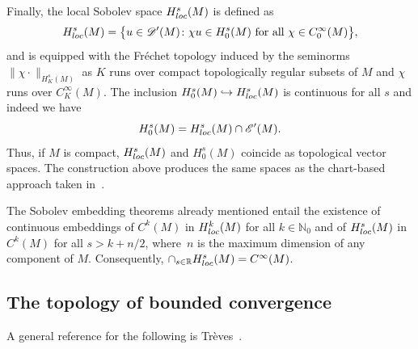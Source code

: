 \documentclass[11pt]{article}
\numberwithin{equation}{section}
\numberwithin{equation}{section}
\newcommand{\RR}{{\mathbb R}}
\newcommand{\NN}{{\mathbb N}}
\newcommand{\DD}{{\mathscr D}}
\newcommand{\EE}{{\mathscr E}}
\newcommand{\loc}{{\rm loc}}
\begin{document}
 Finally, the local Sobolev space $H^s_\loc(M)$ is defined as
 \begin{equation*}
 	H^s_\loc(M) = \big\{u\in\DD'(M)\colon \text{$\chi u\in H^s_0(M)$ for all $\chi\in C_0^\infty({M})$}\big\},
 \end{equation*}
 and is equipped with the Fr\'echet topology induced by the seminorms $\|\chi \cdot\|_{H^s_{K}(M)}$ as $K$ runs over compact topologically regular subsets of $M$ and $\chi$ runs over $C^\infty_K(M)$. The inclusion
 $H^s_0(M)\hookrightarrow H^s_\loc(M)$ is continuous for all $s$ and indeed we have
 \begin{equation*}
 	H^s_0(M) = H^s_\loc(M) \cap \EE'(M).
 \end{equation*}
 Thus, if $M$ is compact, $H^s_\loc(M)$ and $H^s_0(M)$ coincide as topological vector spaces. The construction above produces the same spaces as the chart-based approach taken in~\cite{Hormander3}.

 The Sobolev embedding theorems already mentioned entail the existence of continuous embeddings of $C^k(M)$ in $H^k_\loc(M)$ for all $k\in\NN_0$ and of $H^s_\loc(M)$ in $C^k(M)$ for all $s>k+n/2$, where~$n$ is the maximum dimension of any component of $M$. Consequently, $\cap_{s\in\RR} H^s_\loc(M)=C^\infty(M)$.

 \subsection{The topology of bounded convergence}\label{appx:top_bded_cvgnce}

 A general reference for the following is Tr\`eves~\cite[Chapter~32]{Treves:TVS}.
\end{document}

